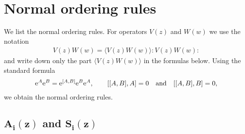 \documentclass[pdftex]{sigma}
\numberwithin{equation}{section}
\begin{document}
\appendix

\section{Normal ordering rules}
\label{appendix:normal}

We list the normal ordering rules.
For operators $V(z)$ and $W(w)$ we use the notation
\begin{gather}
V(z)W(w)=\langle V(z)W(w) \rangle {:}V(z)W(w){:}
\label{def:coupling}
\end{gather}
and write down only the part $\langle V(z)W(w) \rangle$
in the formulas below. Using the standard formula
\begin{gather*}
{\rm e}^A{\rm e}^B={\rm e}^{[A,B]}{\rm e}^B{\rm e}^A,\qquad [[A,B],A]=0\quad \text{and}\quad [[A,B],B]=0,
\end{gather*}
we obtain the normal ordering rules.

\subsection[\protect{$A\_\{i\}(z)$} and \protect{$S\_\{i\}(z)$}]
{$\boldsymbol{A_i(z)}$ and $\boldsymbol{S_i(z)}$}
\end{document}

